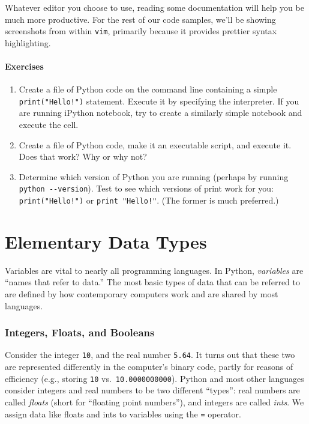 \documentclass[
]{memoir}
\providecommand{\tightlist}{%
  \setlength{\itemsep}{0pt}\setlength{\parskip}{0pt}}
\begin{document}
Whatever editor you choose to use, reading some documentation will help you be much more productive. For the rest of our code samples, we'll be showing screenshots from within \texttt{vim}, primarily because it provides prettier syntax highlighting.

\hypertarget{exercises-1}{%
\subsubsection*{Exercises}\label{exercises-1}}

\begin{enumerate}
\def\labelenumi{\arabic{enumi}.}
\tightlist
\item
  Create a file of Python code on the command line containing a simple \texttt{print("Hello!")} statement. Execute it by specifying the interpreter. If you are running iPython notebook, try to create a similarly simple notebook and execute the cell.
\item
  Create a file of Python code, make it an executable script, and execute it. Does that work? Why or why not?
\item
  Determine which version of Python you are running (perhaps by running \texttt{python\ -\/-version}). Test to see which versions of print work for you: \texttt{print("Hello!")} or \texttt{print\ "Hello!"}. (The former is much preferred.)
\end{enumerate}

\hypertarget{elementary-data-types}{%
\chapter{Elementary Data Types}\label{elementary-data-types}}

Variables are vital to nearly all programming languages. In Python, \emph{variables} are \enquote{names that refer to data.} The most basic types of data that can be referred to are defined by how contemporary computers work and are shared by most languages.

\hypertarget{integers-floats-and-booleans}{%
\subsection*{Integers, Floats, and Booleans}\label{integers-floats-and-booleans}}

Consider the integer \texttt{10}, and the real number \texttt{5.64}. It turns out that these two are represented differently in the computer's binary code, partly for reasons of efficiency (e.g., storing \texttt{10} vs.~\texttt{10.0000000000}). Python and most other languages consider integers and real numbers to be two different \enquote{types}: real numbers are called \emph{floats} (short for \enquote{floating point numbers}), and integers are called \emph{ints}. We assign data like floats and ints to variables using the \texttt{=} operator.
\end{document}
